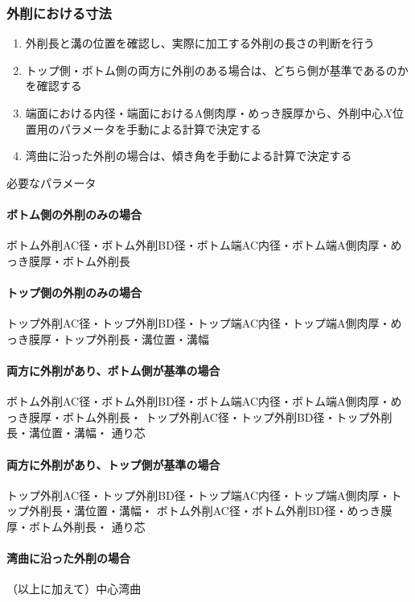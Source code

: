 \clearpage
\subsubsection{外削における寸法}
\begin{enumerate}
\item {}外削長と溝の位置を確認し、実際に加工する外削の長さの判断を行う
\item トップ側・ボトム側の両方に外削のある場合は、どちら側が基準であるのかを確認する
\item 端面における内径・端面におけるA側肉厚・めっき膜厚から、外削中心$X$位置用のパラメータを手動による計算で決定する
\item 湾曲に沿った外削の場合は、傾き角を手動による計算で決定する
\end{enumerate}
\begin{Parameter}{必要なパラメータ}
\paragraph*{ボトム側の外削のみの場合}
ボトム外削AC径・ボトム外削BD径・ボトム端AC内径・ボトム端A側肉厚・めっき膜厚・ボトム外削長
\tcbline*
\paragraph*{トップ側の外削のみの場合}
トップ外削AC径・トップ外削BD径・トップ端AC内径・トップ端A側肉厚・めっき膜厚・トップ外削長・溝位置・溝幅
\tcbline*
\paragraph*{両方に外削があり、ボトム側が基準の場合}
ボトム外削AC径・ボトム外削BD径・ボトム端AC内径・ボトム端A側肉厚・めっき膜厚・ボトム外削長・
トップ外削AC径・トップ外削BD径・トップ外削長・溝位置・溝幅・
通り芯
\tcbline*
\paragraph*{両方に外削があり、トップ側が基準の場合}
トップ外削AC径・トップ外削BD径・トップ端AC内径・トップ端A側肉厚・トップ外削長・溝位置・溝幅・
ボトム外削AC径・ボトム外削BD径・めっき膜厚・ボトム外削長・
通り芯
\tcbline*
\paragraph*{湾曲に沿った外削の場合}
（以上に加えて）中心湾曲
\end{Parameter}

